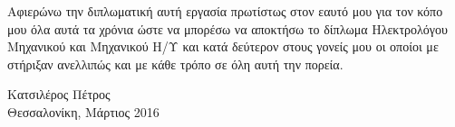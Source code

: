 
\cleardoublepage

\begin{dedication}
\par
Αφιερώνω την διπλωματική αυτή εργασία πρωτίστως στον εαυτό μου για τον κόπο μου όλα αυτά τα χρόνια ώστε να μπορέσω να αποκτήσω το δίπλωμα Ηλεκτρολόγου Μηχανικού και Μηχανικού Η/Υ και κατά δεύτερον στους γονείς μου οι οποίοι με στήριξαν ανελλιπώς και με κάθε τρόπο σε όλη αυτή την πορεία.
\begin{flushright}
Κατσιλέρος Πέτρος \\
Θεσσαλονίκη, Μάρτιος 2016
\end{flushright}
\end{dedication}
